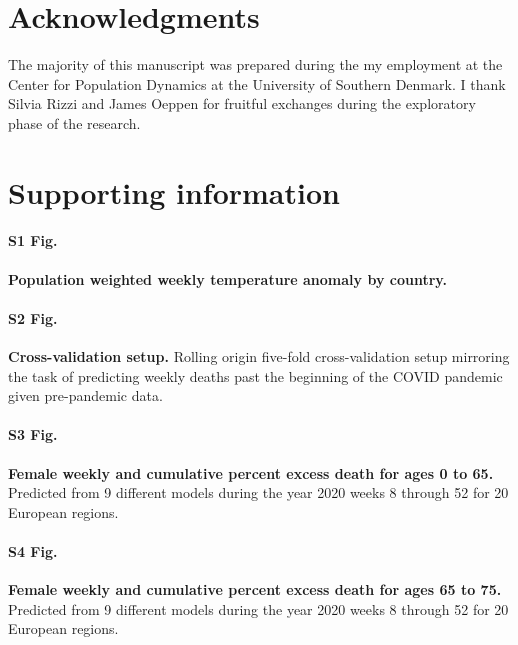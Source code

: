 \documentclass[10pt,letterpaper]{article}
\begin{document}
\section*{Acknowledgments}

The majority of this manuscript was prepared during the my employment at the Center for Population Dynamics at the University of Southern Denmark. I thank Silvia Rizzi and James Oeppen for fruitful exchanges during the exploratory phase of the research.


\section*{Supporting information}



\paragraph*{S1 Fig.}
\label{S1_Fig}
{\bf Population weighted weekly temperature anomaly by country.}


\paragraph*{S2 Fig.}
\label{S2_Fig}
{\bf Cross-validation setup.} Rolling origin five-fold cross-validation setup mirroring the task of predicting weekly deaths past the beginning of the COVID pandemic given pre-pandemic data.


\paragraph*{S3 Fig.}
\label{S3_Fig}
{\bf Female weekly and cumulative percent excess death for ages 0 to 65.} Predicted from 9 different models during the year 2020 weeks 8 through 52 for 20 European regions.

\paragraph*{S4 Fig.}
\label{S4_Fig}
{\bf Female weekly and cumulative percent excess death for ages 65 to 75.} Predicted from 9 different models during the year 2020 weeks 8 through 52 for 20 European regions.
\end{document}
